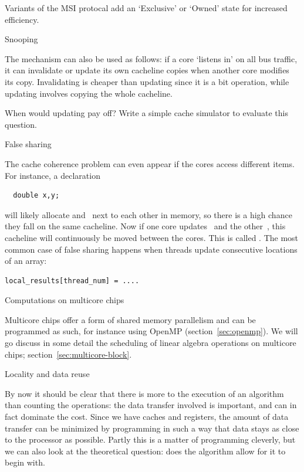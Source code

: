 Variants of the \ac{MSI} protocal add an `Exclusive' or `Owned' state
for increased efficiency.

 {Snooping}

The  mechanism can also be used as follows: if a core
`listens in' on all bus traffic, it can invalidate or update its own cacheline 
copies when another core modifies its copy. Invalidating is cheaper than updating
since it is a bit operation, while updating involves copying the whole cacheline.

\begin{exercise}
  When would updating pay off? Write a simple cache simulator to evaluate this question.
\end{exercise}

 {False sharing}
\label{sec:falseshare}

The cache coherence problem can even appear if the cores access
different items. For instance, a declaration
\begin{verbatim}
  double x,y;
\end{verbatim}
will likely allocate  and~ next to each other in memory, so
there is a high chance they fall on the same cacheline. Now if one
core updates~ and the other~, this cacheline will
continuously be moved between the cores. This is called
.
The most common case of false sharing happens when
threads update consecutive locations of an array:
\begin{verbatim}
local_results[thread_num] = ....
\end{verbatim}


 {Computations on multicore chips}

Multicore chips offer a form of shared memory parallelism and can be
programmed as such, for instance using OpenMP
(section~\ref{sec:openmp}). We will go discuss in some detail the
scheduling of linear algebra operations on multicore chips;
section~\ref{sec:multicore-block}.


 {Locality and data reuse}

By now it should be clear that there is more to the execution of an
algorithm than counting the operations: the data transfer involved is
important, and can in fact dominate the cost. Since we have caches and
registers, the amount of data transfer can be minimized by programming
in such a way that data stays as close to the processor as
possible. Partly this is a matter of programming cleverly, but we can
also look at the theoretical question: does the algorithm allow for it
to begin with.

